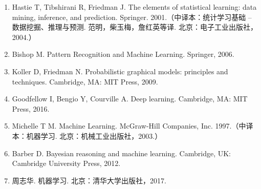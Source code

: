 \documentclass[UTF8, 12pt, fontset=fandol, oneside]{ctexart}
\begin{document}
\begin{enumerate}
  \item Hastie T, Tibshirani R, Friedman J. The elements of statistical learning: data mining, inference, and prediction. Springer. 2001.（中译本：统计学习基础 -- 数据挖掘、推理与预测. 范明，柴玉梅，詹红英等译. 北京：电子工业出版社，2004.）
  \item Bishop M. Pattern Recognition and Machine Learning. Springer, 2006.
  \item Koller D, Friedman N. Probabilistic graphical models: principles and techniques. Cambridge, MA: MIT Press, 2009.
  \item Goodfellow I, Bengio Y, Courville A. Deep learning. Cambridge, MA: MIT Press, 2016.
  \item Michelle T M. Machine Learning. McGraw-Hill Companies, Inc. 1997.（中译本：机器学习. 北京：机械工业出版社，2003.）
  \item Barber D. Bayesian reasoning and machine learning. Cambridge, UK: Cambridge University Press, 2012.
  \item 周志华. 机器学习. 北京：清华大学出版社，2017.
\end{enumerate}
\end{document}

